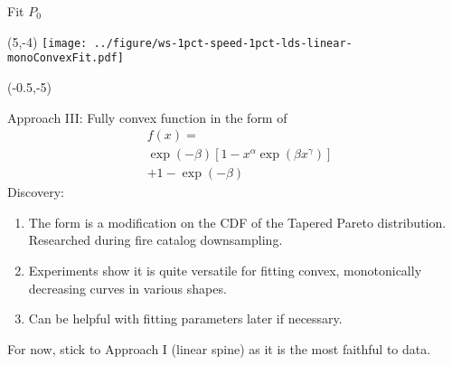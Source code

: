 \documentclass[aspectratio=169]{beamer}
\begin{document}
\begin{frame}{Fit $P_0$}
\begin{textblock}{1}(5,-4)
\texttt{[image: ../figure/ws-1pct-speed-1pct-lds-linear-monoConvexFit.pdf]}
\end{textblock}



\begin{textblock}{5}(-0.5,-5)

\tiny Approach III: Fully convex function in the form of
\tiny \begin{equation*}
\begin{split}
&f(x) = \\
&\exp(-\beta)[1 - x^\alpha\exp(\beta x ^ \gamma)]\\
&+  1 - \exp(-\beta)
\end{split}
\end{equation*}
\tiny Discovery:\medskip

\begin{enumerate}
\tiny \item The form is a modification on the CDF of the Tapered Pareto distribution. Researched during fire catalog downsampling.\medskip

\tiny \item Experiments show it is quite versatile for fitting convex, monotonically decreasing curves in various shapes.\medskip

\tiny\item Can be helpful with fitting parameters later if necessary.
\end{enumerate}\medskip

For now, stick to Approach I (linear spine) as it is the most faithful to data.
\end{textblock}
\end{frame}
\end{document}
